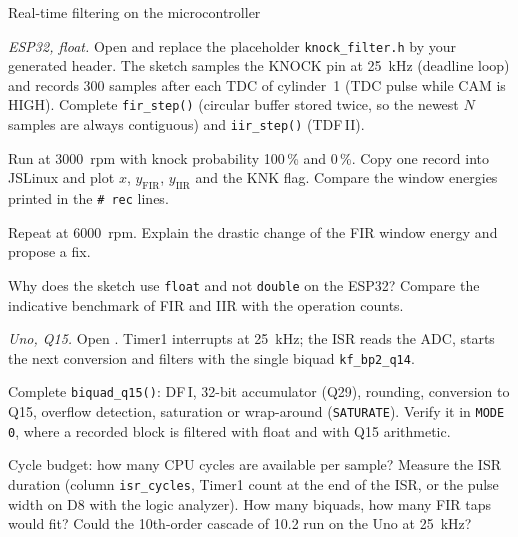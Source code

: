 \begin{exercise}{Real-time filtering on the microcontroller}{\Wokwi}
\sloppy
\begin{tasks}
  \item \emph{ESP32, float.} Open  and
    replace the placeholder \texttt{knock\_filter.h} by your generated header.
    The sketch samples the KNOCK pin at \SI{25}{kHz} (deadline loop) and
    records 300 samples after each TDC of cylinder~1 (TDC pulse while CAM is
    HIGH). Complete \texttt{fir\_step()} (circular buffer stored twice, so the
    newest $N$ samples are always contiguous) and \texttt{iir\_step()} (TDF\,II).
    \begin{tasks}
      \item Run at \SI{3000}{rpm} with knock probability 100\,\% and 0\,\%.
        Copy one record into JSLinux and plot $x$, $y_\text{FIR}$, $y_\text{IIR}$
        and the KNK flag. Compare the window energies printed in the
        \texttt{\# rec} lines.
      \item Repeat at \SI{6000}{rpm}. Explain the drastic change of the FIR
        window energy and propose a fix.
      \item Why does the sketch use \texttt{float} and not \texttt{double}
        on the ESP32? Compare the indicative benchmark of FIR and IIR with the
        operation counts.
    \end{tasks}
  \item \emph{Uno, Q15.} Open . Timer1
    interrupts at \SI{25}{kHz}; the ISR reads the ADC, starts the next
    conversion and filters with the single biquad \texttt{kf\_bp2\_q14}.
    \begin{tasks}
      \item Complete \texttt{biquad\_q15()}: DF\,I, 32-bit accumulator (Q29),
        rounding, conversion to Q15, overflow detection, saturation or
        wrap-around (\texttt{SATURATE}). Verify it in \texttt{MODE 0}, where a
        recorded block is filtered with float and with Q15 arithmetic.
      \item Cycle budget: how many CPU cycles are available per sample? Measure
        the ISR duration (column \texttt{isr\_cycles}, Timer1 count at the end of
        the ISR, or the pulse width on D8 with the logic analyzer). How many
        biquads, how many FIR taps would fit? Could the 10th-order cascade of
        10.2 run on the Uno at \SI{25}{kHz}?

\end{tasks}
\end{tasks}
\end{exercise}

